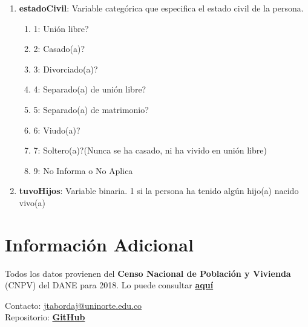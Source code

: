 \documentclass[12pt,a4paper]{article}
\begin{document}
\begin{enumerate}
\begin{enumerate}
		\end{enumerate}
	\item \textbf{estadoCivil}: Variable categórica que especifica el estado civil de la persona.
		\begin{enumerate}
			\item 1: Unión libre?
			\item 2: Casado(a)?
			\item 3: Divorciado(a)?
			\item 4: Separado(a) de unión libre?
			\item 5: Separado(a) de matrimonio?
			\item 6: Viudo(a)?
			\item 7: Soltero(a)?(Nunca se ha casado, ni ha vivido en unión libre)
			\item 9: No Informa o No Aplica
		\end{enumerate}
	\item \textbf{tuvoHijos}: Variable binaria. 1 si la persona ha tenido algún hijo(a) nacido vivo(a)
\end{enumerate}

\section*{Información Adicional}


Todos los datos provienen del \textbf{Censo Nacional de Población y Vivienda} (CNPV) del DANE para 2018. Lo puede consultar \href{https://microdatos.dane.gov.co/index.php/catalog/643/study-description}{\textbf{aquí}}

\vfill

\noindent Contacto: \href{mailto:jtabordaj@uninorte.edu.co}{jtabordaj@uninorte.edu.co} \\
Repositorio: \textbf{\href{https://github.com/jtabordaj/research_eslatina}{GitHub}}
\end{document}
